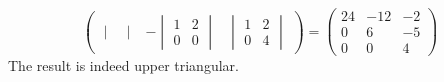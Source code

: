 \begin{exercises}
\begin{answer}
\begin{exparts}
\begin{equation*}
\begin{pmatrix}
\begin{vmatrix}
              \end{vmatrix}
              &-\begin{vmatrix}
                1  &2  \\  0  &0
              \end{vmatrix}
              &\begin{vmatrix}
                1  &2  \\  0  &4
              \end{vmatrix}
            \end{pmatrix}
            =
            \begin{pmatrix}
              24  &-12 &-2 \\
               0  &6   &-5  \\
               0  &0   &4
            \end{pmatrix}
          \end{equation*}
          The result is indeed upper triangular.


\end{exparts}
\end{answer}
\end{exercises}
